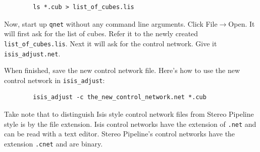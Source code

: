 \begin{verbatim}
        ls *.cub > list_of_cubes.lis
\end{verbatim}

Now, start up \texttt{qnet} without any command line arguments. Click
File$\rightarrow$Open. It will first ask for the list of cubes. Refer
it to the newly created \texttt{list\_of\_cubes.lis}. Next it will ask for
the control network. Give it \texttt{isis\_adjust.net}.

\begin{center}
\end{center}

When finished, save the new control network file. Here's how to use
the new control network in \texttt{isis\_adjust}:

\begin{verbatim}
        isis_adjust -c the_new_control_network.net *.cub
\end{verbatim}

Take note that to distinguish Isis style control network files from
Stereo Pipeline style is by the file extension. Isis control networks
have the extension of \texttt{.net} and can be read with a text
editor. Stereo Pipeline's control networks have the extension
\texttt{.cnet} and are binary.

%
%
